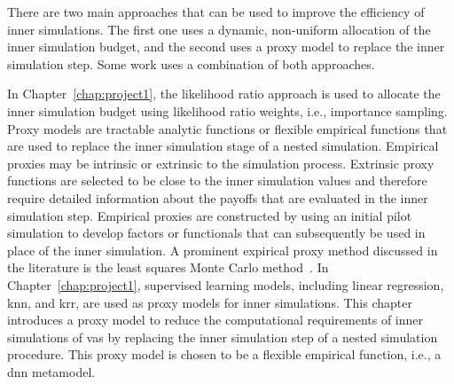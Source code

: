 There are two main approaches that can be used to improve the efficiency of inner simulations.
The first one uses a dynamic, non-uniform allocation of the inner simulation budget, and the second uses a proxy model to replace the inner simulation step.
Some work uses a combination of both approaches.

In Chapter~\ref{chap:project1}, the likelihood ratio approach is used to allocate the inner simulation budget using likelihood ratio weights, i.e., importance sampling.
Proxy models are tractable analytic functions or flexible empirical functions that are used to replace the inner simulation stage of a nested simulation.
Empirical proxies may be intrinsic or extrinsic to the simulation process. Extrinsic proxy functions are selected to be close to the inner simulation values and therefore require detailed information about the payoffs that are evaluated in the inner simulation step. 
Empirical proxies are constructed by using an initial pilot simulation to develop factors or functionals that can subsequently be used in place of the inner simulation. 
A prominent expirical proxy method discussed in the literature is the least squares Monte Carlo method~\citep{longstaff2001valuing}.
In Chapter~\ref{chap:project1}, supervised learning models, including linear regression, \gls{knn}, and \gls{krr}, are used as proxy models for inner simulations.
This chapter introduces a proxy model to reduce the computational requirements of inner simulations of \gls{va}s by replacing the inner simulation step of a nested simulation procedure. 
This proxy model is chosen to be a flexible empirical function, i.e., a \gls{dnn} metamodel.

